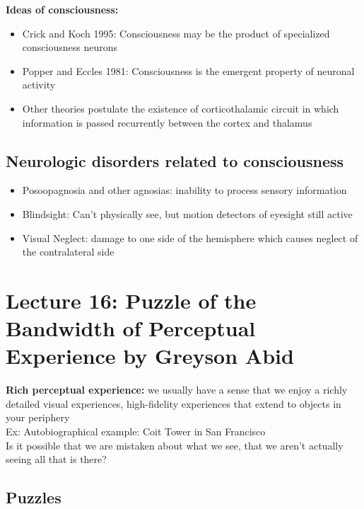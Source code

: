 \documentclass{article}
\begin{document}
\textbf{Ideas of consciousness:} \\
\begin{itemize}
    \item Crick and Koch 1995: Consciousness may be the product of specialized consciousness neurons
    \item Popper and Eccles 1981: Consciousness is the emergent property of neuronal activity
    \item Other theories postulate the existence of corticothalamic circuit in which information is passed recurrently between the cortex and thalamus
\end{itemize}

\subsection{Neurologic disorders related to consciousness} 
\begin{itemize}
    \item Posoopagnosia and other agnosias: inability to process sensory information
    \item Blindsight: Can't physically see, but motion detectors of eyesight still active
    \item Visual Neglect: damage to one side of the hemisphere which causes neglect of the contralateral side
\end{itemize}

\section{Lecture 16: Puzzle of the Bandwidth of Perceptual Experience by Greyson Abid}
\textbf{Rich perceptual experience:} we usually have a sense that we enjoy a richly detailed visual experiences, high-fidelity experiences that extend to objects in your periphery \\ 
Ex: Autobiographical example: Coit Tower in San Francisco \\

\noindent Is it possible that we are mistaken about what we see, that we aren't actually seeing all that is there? \\

\subsection{Puzzles}
\end{document}
